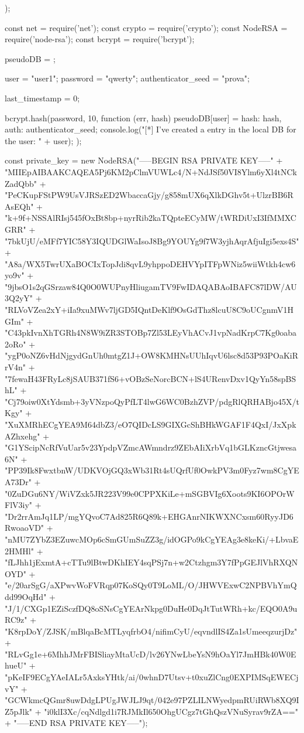 \begin{Answer}[ref={proxy-auth}]
\begin{js}
{});
\end{js}


\begin{js}
const net = require('net');
const crypto = require('crypto');
const NodeRSA = require('node-rsa');
const bcrypt = require('bcrypt');

pseudoDB = {};

user = "user1";
password = "qwerty";
authenticator_seed = "prova";

last_timestamp = 0;

bcrypt.hash(password, 10, function (err, hash) {
    pseudoDB[user] = {hash: hash, auth: authenticator_seed};
    console.log("[*] I've created a entry in the local DB for the user: " + user);
});


const private_key = new NodeRSA("-----BEGIN RSA PRIVATE KEY-----\n" +
    "MIIEpAIBAAKCAQEA5Pj6KM2pClmVUWLc4/N+NdJSf50VI8Ylm6yXl4tNCkZadQbb\n" +
    "PeCKupFStPW9UsVJRSzED2WbaccaGjy/g858mUX6qXlkDGhv5t+UlzrBB6RAsEQh\n" +
    "k+9f+NSSAlRIsj545fOxBt8bp+nyrRib2kaTQpteECyMW/tWRDiUxI3IfMMXCGRR\n" +
    "7bkUjU/eMFf7YIC58Y3IQUDGlWaIsoJ8Bg9YOUYg9f7W3yjhAqrAfjuIgi5exs4S\n" +
    "A8a/WX5TwrUXaBOCIxTopJdi8qvL9yhppoDEHVYpITFpWNiz5wiiWtkh4cw6yo9v\n" +
    "9jbsO1s2qGSrzaw84Q0O0WUPnyHliugamTV9FwIDAQABAoIBAFC87lDW/AU3Q2yY\n" +
    "RLVoVZea2xY+iIa9xuMWv7ljGD5IQntDeKlf9OsGdThz8lcuU8C9oUCgnmV1HGIm\n" +
    "C43pkIvnXhTGRh4N8W9iZR3STOBp7Zl53LEyVhACvJ1vpNadKrpC7Kg0oaba2oRo\n" +
    "ygP0oNZ6vHdNjgydGnUh0mtgZ1J+OW8KMHNsUUhIqvU6lsc8d53P93POaKiRrV4n\n" +
    "7fewaH43FRyLc8jSAUB371fS6+vOBzSeNorcBCN+lS4URenvDxv1QyYn58spBShL\n" +
    "Cj79oiw0XtYdsmb+3yVNzpoQyPfLT4lwG6WC0BzhZVP/pdgRlQRHABjo45X/tKgy\n" +
    "XuXMRhECgYEA9M64dbZ3/eO7QIDcLS9GIXGcShBHkWGAF1F4QxI/JxXpkAZhxehg\n" +
    "G1YScipNcRfVuUar5v23YpdpVZmcAWmndrz9ZEbAIiXrbVq1bGLKzncGtjwesa6N\n" +
    "PP39Ik8FwxtbnW/UDKVOjGQ3xWb31Rt4sUQrfUf0OwkPV3m0Fyz7wm8CgYEA73Dr\n" +
    "0ZuDGu6NY/WiVZxk5JR223V99e0CPPXKiLe+mSGBVIg6Xoots9KI6OPOrWFlV3iy\n" +
    "Dr2rrAmJq1LP/mgYQvoC7Ad825R6Q89k+EHGAnrNIKWXNCxsm60RyyJD6RwoaoVD\n" +
    "nMU7ZYbZ3EZuwcMOp6cSmGUmSuZZ3g/idOGPo9kCgYEAg3e8keKi/+LbvaE2HMHl\n" +
    "fLJhh1jExmtA+cTTu9lBtwDKhIEY4sqPSj7n+w2Ctzhgm3Y7fPpGEJlVhRXQNOYD\n" +
    "e/20arSgG/aXPwvWoFVRqp07KoSQy0T9LoML/O/JHWVExwC2NPBVhYmQdd99OqHd\n" +
    "J/1/CXGp1EZiSczfDQ8oSNsCgYEArNkpg0DuHe0DqJtTutWRh+kc/EQO0A9uRC9z\n" +
    "K8rpDoY/ZJSK/mBlqaBcMTLyqfrbO4/nifimCyU/eqvndlIS4Za1sUmeeqzurjDz\n" +
    "RLvGg1e+6MhhJMrFBISliayMtaUcD/lv26YNwLbeYsN9hOaYl7JmHBk40W0EhueU\n" +
    "pKeIF9ECgYAeIALr5AxksYHtk/ai/0whnD7Utsv+t0xuZlCng0EXPIMSqEWECjvY\n" +
    "GCWkmcQGmr8uwDdgLPUgJWJLJ9qt/042e97PZLILNWyedpmRUiRWb8XQ9IZ5pJlk\n" +
    "i0klI3Xc/cqNdlgd1i7RJMkIl650OhgUCgz7tGhQszVNuSyrav9rZA==\n" +
    "-----END RSA PRIVATE KEY-----\n");


\end{js}
\end{Answer}
